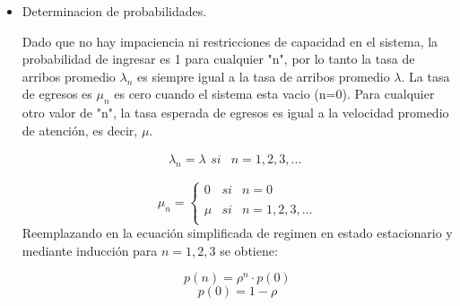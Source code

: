 \documentclass{article}
\begin{document}
\begin{itemize}
    \item Determinacion de probabilidades.

    Dado que no hay impaciencia ni restricciones de capacidad en el sistema, la probabilidad de ingresar es 1 para cualquier "n", por lo tanto la tasa de arribos promedio \(\lambda_n\) es siempre igual a la tasa de arribos promedio \(\lambda\).
    \newline La tasa de egresos es \(\mu_n\) es cero cuando el sistema esta vacio (n=0). Para cualquier otro valor de "n", la tasa esperada de egresos es igual a la velocidad promedio de atención, es decir, \(\mu\).

    \[
        \lambda_n =  \lambda \begin{array}{lcc}
                    si & n = 1,2,3,...
                    \end{array}
    \]

    \[
        \mu_n = \left\{ \begin{array}{lcc}
            0 &   si  & n = 0 \\
            \\ \mu &  si & n = 1,2,3,... \\
            \end{array}
        \right.
    \]
    Reemplazando en la ecuación simplificada de regimen en estado estacionario y mediante inducción para \(n=1,2,3\) se obtiene:

    \begin{equation} \label{eu_eqn}
        p(n) = \rho^n \cdot p(0)
    \end{equation}
    \begin{equation} \label{eu_eqn}
        p(0) = 1-\rho
    \end{equation}
    

\end{itemize}
\end{document}
